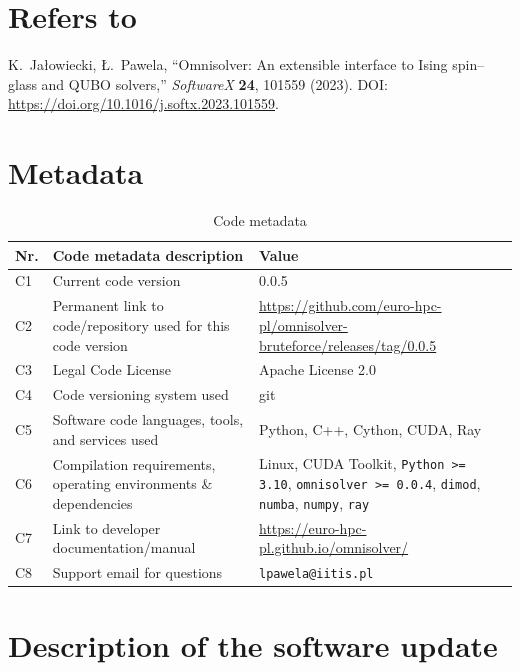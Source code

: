 \documentclass[preprint,12pt,a4paper]{elsarticle}
\begin{document}
\section*{Refers to}
K.~Ja\l{}owiecki, {\L}.~Pawela, ``Omnisolver: An extensible interface to Ising
spin--glass and QUBO solvers,'' \emph{SoftwareX} \textbf{24}, 101559 (2023).
DOI: \url{https://doi.org/10.1016/j.softx.2023.101559}.

\section*{Metadata}
\label{metadata}

\begin{table}[H]
\setlength{\tabcolsep}{4pt}
\begin{tabular}{|l|p{5.6cm}|p{6.4cm}|}
\hline
\textbf{Nr.} & \textbf{Code metadata description} & \textbf{Value} \\
\hline
C1 & Current code version & 0.0.5 \\
\hline
C2 & Permanent link to code/repository used for this code version &
\url{https://github.com/euro-hpc-pl/omnisolver-bruteforce/releases/tag/0.0.5} \\
\hline
C3 & Legal Code License & Apache License 2.0 \\
\hline
C4 & Code versioning system used & git \\
\hline
C5 & Software code languages, tools, and services used & Python, C++, Cython,
CUDA, Ray \\
\hline
C6 & Compilation requirements, operating environments \& dependencies & Linux,
CUDA Toolkit, \texttt{Python >= 3.10}, \texttt{omnisolver >= 0.0.4},
\texttt{dimod}, \texttt{numba}, \texttt{numpy}, \texttt{ray} \\
\hline
C7 & Link to developer documentation/manual &
\url{https://euro-hpc-pl.github.io/omnisolver/} \\
\hline
C8 & Support email for questions & \verb|lpawela@iitis.pl| \\
\hline
\end{tabular}
\caption{Code metadata}
\label{codeMetadata}
\end{table}


\section{Description of the software update}
\label{sec:description}
\end{document}
